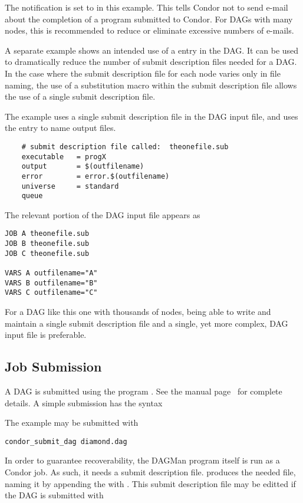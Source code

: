 The notification is set to \verb@NEVER@ in this example.
This tells Condor not to send e-mail about the completion of a program
submitted to Condor.
For DAGs with many nodes, this is recommended
to reduce or eliminate excessive numbers of e-mails.

A separate example shows an intended use of a  entry
in the DAG.
It can be used to dramatically reduce the number of submit description
files needed for a DAG.
In the case where the submit description file for each node
varies only in file naming, the use of a substitution macro
within the submit description file allows the use of 
a single submit description file.

The example uses a single submit description file in the DAG input
file, and uses the  entry to name output files.

\begin{verbatim}
	# submit description file called:  theonefile.sub
	executable   = progX
	output       = $(outfilename)
	error        = error.$(outfilename)
	universe     = standard
	queue
\end{verbatim}

The relevant portion of the DAG input file appears as 
\begin{verbatim}
JOB A theonefile.sub
JOB B theonefile.sub
JOB C theonefile.sub

VARS A outfilename="A"
VARS B outfilename="B"
VARS C outfilename="C"
\end{verbatim}

For a DAG like this one with thousands of nodes,
being able to write and maintain a single submit description file 
and a single, yet more complex, DAG input file is preferable.

\subsection{\label{dagman:submitdag}Job Submission}

A DAG is submitted using the program .
See the manual
page~\pageref{man-condor-submit}
for complete details.
A simple submission has the syntax

 

The example may be submitted with

\begin{verbatim}
condor_submit_dag diamond.dag
\end{verbatim}
In order to guarantee recoverability, the DAGMan program itself
is run as a Condor job.
As such, it needs a submit description file.
 produces the needed file,
naming it by appending the  with
.
This submit description file may be editted if the DAG is
submitted with

